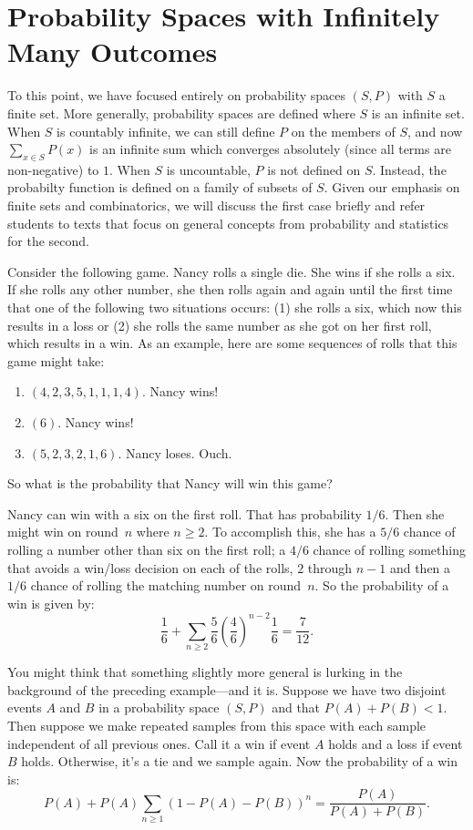 \section{Probability Spaces with Infinitely Many Outcomes}\label{s:probability:infinite-outcomes}

To this point, we have focused entirely on probability spaces
$(S,P)$ with $S$ a finite set.  More generally, probability
spaces are defined where $S$ is an infinite set.  When $S$ is
countably infinite, we can still define $P$ on the members
of $S$, and now $\sum_{x\in S} P(x)$ is an infinite sum
which converges absolutely (since all terms are non-negative)
to $1$.  When $S$ is uncountable, $P$ is not defined on $S$.
Instead, the probabilty function is defined on a family of
subsets of $S$.  Given our emphasis on finite sets and combinatorics,
we will discuss the first case briefly and refer students to
texts that focus on general concepts from probability and statistics
for the second.

\begin{example}
  Consider the following game.  Nancy rolls a single die.  She wins
  if she rolls a six.  If she rolls any other number, she then rolls
  again and again until the first time that one of the following two
  situations occurs: (1) she rolls a six, which now this results in a
  loss or (2) she rolls the same number as she got on her first roll,
  which results in a win. As an example, here are some sequences of
  rolls that this game might take:
\begin{enumerate}
\item $(4,2,3,5,1,1,1,4)$.  Nancy wins!
\item $(6)$.  Nancy wins!
\item $(5,2, 3,2,1,6)$. Nancy loses. Ouch.
\end{enumerate}
So what is the probability that Nancy will win this game?

Nancy can win with a six on the first roll.  That has probability $1/6$.
Then she might win on round~$n$ where $n\ge2$.  To accomplish this, she
has a $5/6$ chance of rolling a number other than six on the first roll;
a $4/6$ chance of rolling something that avoids a win/loss decision on
each of the rolls, $2$ through $n-1$ and then a $1/6$ chance of rolling
the matching number on round~$n$.
So the probability of a win is given by:
\[
 \frac{1}{6}+\sum_{n\ge 2}\frac{5}{6}\left(\frac{4}{6}\right)^{n-2}\frac{1}{6} = \frac{7}{12}.
\]

\end{example}
\begin{example}
You might think that something slightly more general is lurking
in the background of the preceding example---and it is.  Suppose we
have two disjoint events $A$ and $B$ in a probability space $(S,P)$ and
that $P(A)+P(B)<1$.  Then suppose
we make repeated samples from this space with each sample independent
of all previous ones.  Call it a win if event $A$ holds and a loss if
event $B$ holds.  Otherwise, it's a tie and we sample again.  Now the
probability of a win is:
\[
P(A)+P(A)\sum_{n\ge 1}(1-P(A)-P(B))^n=\frac{P(A)}{P(A)+P(B)}.
\]
\end{example}

